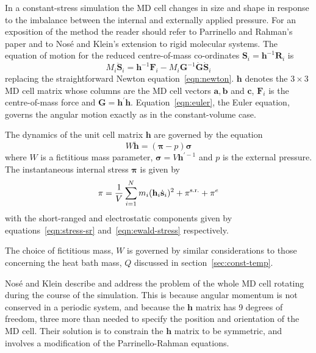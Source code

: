 \documentclass[a4paper,twoside]{report}
\newcommand{\bm}[1]{\mathbf{#1}}
\begin{document}
In a constant-stress simulation the MD cell changes in size and shape
in response to the imbalance between the internal and externally
applied pressure.  For an exposition of the method the reader should
refer to Parrinello and Rahman's paper\cite{parrinello:81} and to
Nos\'{e} and Klein's extension to rigid molecular
systems\cite{nose:83}.  The equation of motion for the reduced
centre-of-mass co-ordinates $\bm{S}_i =
\bm{h}^{-1}\bm{R}_i$ is
\begin{equation}
\label{eqn:par}
M_i\ddot{\bm{S}}_i = \bm{h}^{-1} \bm{F}_i - M_i \bm{G}^{-1}\dot{\bm{G}}\dot{\bm{S}}_i
\end{equation}
replacing the straightforward Newton equation~\ref{eqn:newton}.
$\bm{h}$ denotes the $3 \times 3$ MD cell matrix whose columns are
the MD cell vectors $\bm{a}, \bm{b}$ and $\bm{c}$, $\bm{F}_i$ is the
centre-of-mass force and $\bm{G} =\bm{h^\prime h}$.
Equation~\ref{eqn:euler}, the Euler equation, governs the angular
motion exactly as in the constant-volume case.

The dynamics of the unit cell matrix $\bm{h}$ are governed by the
equation
\begin{equation}
\label{eqn:rahman}
W\ddot{\bm{h}} = \left ( \bm\pi - p \right ) \bm\sigma
\end{equation}
where $W$ is a fictitious mass parameter, $\bm\sigma = V
\bm{h}^{\prime-1}$ and $p$ is the external pressure.  The
instantaneous internal stress $\bm\pi$ is given by 
\begin{equation}
\label{eqn:prstress}
\bm\pi = \frac{1}{V}\sum_{i=1}^N m_i (\bm{h}_i\dot{\bm{s}}_i)^2 +
\bm\pi^{\textnormal{s.r.}} + \bm\pi^e 
\end{equation}
with the short-ranged and electrostatic components given by
equations~\ref{eqn:stress-sr} and~\ref{eqn:ewald-stress} respectively.

The choice of fictitious mass, $W$ is governed by similar
considerations to those concerning the heat bath mass, $Q$
discussed in section~\ref{sec:const-temp}.

Nos\'{e} and Klein\cite{nose:83} describe and address the problem of
the whole MD cell rotating during the course of the simulation.  This
is because angular momentum is not conserved in a periodic system, and
because the $\bm{h}$ matrix has 9 degrees of freedom, three more than
needed to specify the position and orientation of the MD cell.  Their
solution is to constrain the $\bm{h}$ matrix to be symmetric, and
involves a modification of the Parrinello-Rahman equations.
\end{document}

